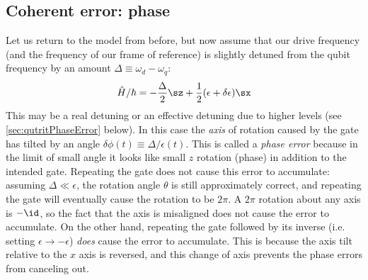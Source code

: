 \subsection{Coherent error: phase}
Let us return to the model from before, but now assume that our drive frequency (and the frequency of our frame of reference) is slightly detuned from the qubit frequency by an amount $\Delta \equiv \omega_d-\omega_q$:
\begin{equation}
    \label{eq:errorHam}
    \hat{H}/\hbar = -\frac{\Delta}{2}\sz + \frac{1}{2}(\epsilon + \delta\epsilon)\sx
\end{equation}
This may be a real detuning or an effective detuning due to higher levels (see \cref{sec:qutritPhaseError} below). In this case the \emph{axis} of rotation caused by the gate has tilted by an angle $\delta\phi(t)\equiv \Delta/\epsilon(t)$. This is called a \textit{phase error} because in the limit of small angle it looks like small $z$ rotation (phase) in addition to the intended gate. Repeating the gate does not cause this error to accumulate: assuming $\Delta\ll\epsilon$, the rotation angle $\theta$ is still approximately correct, and repeating the gate will eventually cause the rotation to be $2\pi$. A $2\pi$ rotation about any axis is $-\id$, so the fact that the axis is misaligned does not cause the error to accumulate. On the other hand, repeating the gate followed by its inverse (i.e. setting $\epsilon\rightarrow-\epsilon$) \textit{does} cause the error to accumulate. This is because the axis tilt relative to the $x$ axis is reversed, and this change of axis prevents the phase errors from canceling out.
